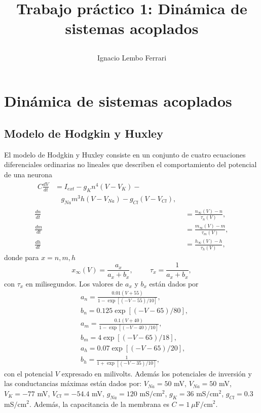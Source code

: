 \documentclass[11pt,twocolumn,twoside]{opticajnl}
\title{

\vspace{0.5cm} 

Trabajo práctico 1: Dinámica de sistemas acoplados}
\author[1]{\huge{Ignacio Lembo Ferrari}}
\affil[1]{\large{ignaciolembo@ib.edu.ar} 

\vspace{0.3cm}

\Large{13 de septiembre de 2023.}}
\begin{document}
\maketitle

\section{Dinámica de sistemas acoplados \label{sec:p1}}

\vspace{0.3cm}

\subsection{Modelo de Hodgkin y Huxley \label{sec:modelo}}

\vspace{0.3cm}

El modelo de Hodgkin y Huxley consiste en un conjunto de cuatro ecuaciones diferenciales ordinarias no lineales que describen el comportamiento del potencial de una neurona
\begin{align}
    \begin{split}
        C \frac{d V}{d t} &= I_{ext} - g_{K}n^4(V-V_{K}) - \\
                          &~~~~g_{Na}m^3h(V-V_{Na})  - g_{Cl}(V-V_{Cl}), 
        \label{ec:corriente}
    \end{split} \\
    \frac{dn}{dt} &= \frac{n_{\infty}(V) - n}{\tau_n(V)}, \\
    \frac{dm}{dt} &=\frac{m_{\infty}(V) - m}{\tau_m(V)}, \\
    \frac{dh}{dt} &= \frac{h_{\infty}(V) - h}{\tau_h(V)}, 
\end{align}
donde para $x=n,m,h$ 
\begin{equation}
    x_{\infty}(V) = \frac{a_x}{a_x+b_x}, \hspace{1cm} \tau_x = \frac{1}{a_x + b_x},
\end{equation}
con $\tau_x$ en milisegundos. Los valores de $a_x$ y $b_x$ están dados por
\begin{align}
    &a_n = \frac{0.01 (V+55)}{1 - \exp[ (-V-55) / 10 ]}, \\
    &b_n = 0.125\exp[ (-V-65)/80], \\
    &a_m = \frac{0.1 (V+40)}{1 - \exp[ (-V-40) / 10 ]}, \\
    &b_m = 4 \exp[ (-V - 65)/18 ], \\
    &a_h = 0.07 \exp[ (-V - 65)/20 ], \\
    &b_h = \frac{1}{1 + \exp[ (-V-35)/10 ]},
\end{align} 
con el potencial $V$ expresado en milivolts. Además los potenciales de inversión y las conductancias máximas están dados por: $V_{Na} = 50$ mV,  $V_{Na} = 50$ mV,  $V_{K} = -77$ mV,  $V_{Cl} = -54.4$ mV, $g_{Na} = 120$ mS$/$cm$^2$, $g_{K} = 36$ mS$/$cm$^2$, $g_{Cl} = 0.3$ mS$/$cm$^2$. Además, la capacitancia de la membrana es $C = 1~\mu\text{F}/\text{cm}^2$.
\end{document}
